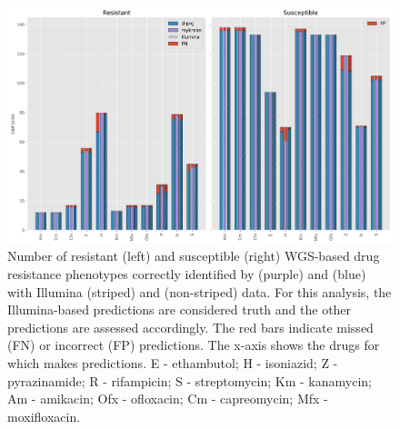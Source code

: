\begin{figure}
\begin{center}
\includegraphics[width=0.90\columnwidth]{Chapter3/Figs/illumina_concordance.png}
\caption{{Number of resistant (left) and susceptible (right) WGS-based drug resistance phenotypes correctly identified by \mykrobe{} \ont{} (purple) and \drprg{} (blue) with Illumina (striped) and \ont{} (non-striped) data. For this analysis, the Illumina-based \mykrobe{} predictions are considered truth and the other predictions are assessed accordingly. The red bars indicate missed (FN) or incorrect (FP) predictions. The x-axis shows the drugs for which \mykrobe{} makes predictions. E - ethambutol; H - isoniazid; Z - pyrazinamide; R - rifampicin; S - streptomycin; Km - kanamycin; Am - amikacin; Ofx - ofloxacin; Cm - capreomycin; Mfx - moxifloxacin.
{\label{fig:geno-concordance}}
}}
\end{center}
\end{figure}

